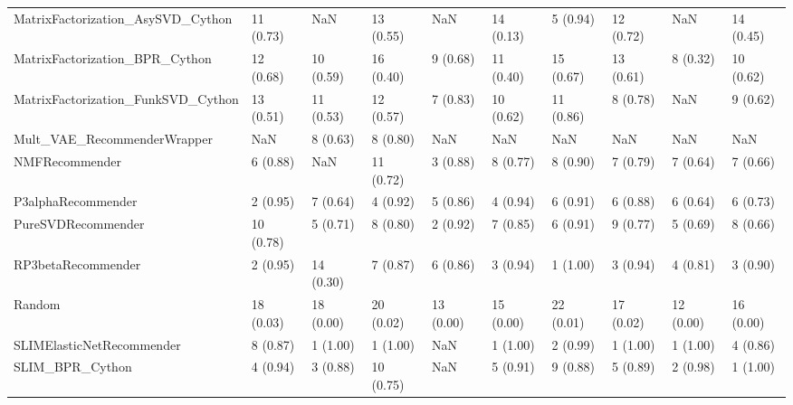 \begin{tabular}{llllllllll}
  MatrixFactorization\_AsySVD\_Cython &                11 (0.73) &         NaN &     13 (0.55) &          NaN &            14 (0.13) &            5 (0.94) &         12 (0.72) &                NaN &         14 (0.45) \\
     MatrixFactorization\_BPR\_Cython &                12 (0.68) &   10 (0.59) &     16 (0.40) &     9 (0.68) &            11 (0.40) &           15 (0.67) &         13 (0.61) &           8 (0.32) &         10 (0.62) \\
 MatrixFactorization\_FunkSVD\_Cython &                13 (0.51) &   11 (0.53) &     12 (0.57) &     7 (0.83) &            10 (0.62) &           11 (0.86) &          8 (0.78) &                NaN &          9 (0.62) \\
        Mult\_VAE\_RecommenderWrapper &                      NaN &    8 (0.63) &      8 (0.80) &          NaN &                  NaN &                 NaN &               NaN &                NaN &               NaN \\
                     NMFRecommender &                 6 (0.88) &         NaN &     11 (0.72) &     3 (0.88) &             8 (0.77) &            8 (0.90) &          7 (0.79) &           7 (0.64) &          7 (0.66) \\
                 P3alphaRecommender &                 2 (0.95) &    7 (0.64) &      4 (0.92) &     5 (0.86) &             4 (0.94) &            6 (0.91) &          6 (0.88) &           6 (0.64) &          6 (0.73) \\
                 PureSVDRecommender &                10 (0.78) &    5 (0.71) &      8 (0.80) &     2 (0.92) &             7 (0.85) &            6 (0.91) &          9 (0.77) &           5 (0.69) &          8 (0.66) \\
                 RP3betaRecommender &                 2 (0.95) &   14 (0.30) &      7 (0.87) &     6 (0.86) &             3 (0.94) &            1 (1.00) &          3 (0.94) &           4 (0.81) &          3 (0.90) \\
                             Random &                18 (0.03) &   18 (0.00) &     20 (0.02) &    13 (0.00) &            15 (0.00) &           22 (0.01) &         17 (0.02) &          12 (0.00) &         16 (0.00) \\
          SLIMElasticNetRecommender &                 8 (0.87) &    1 (1.00) &      1 (1.00) &          NaN &             1 (1.00) &            2 (0.99) &          1 (1.00) &           1 (1.00) &          4 (0.86) \\
                    SLIM\_BPR\_Cython &                 4 (0.94) &    3 (0.88) &     10 (0.75) &          NaN &             5 (0.91) &            9 (0.88) &          5 (0.89) &           2 (0.98) &          1 (1.00) \\

\end{tabular}
